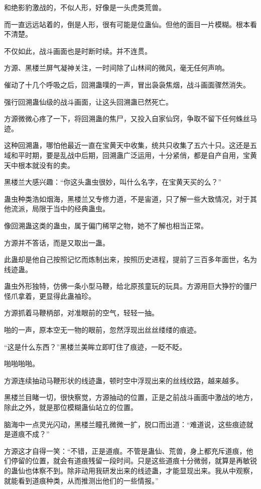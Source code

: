 \begin{this_body}
和绝影豹激战的，不似人形，好像是一头虎类荒兽。

而一直远远站着的，倒是人形，很有可能是位蛊仙。但他的面目一片模糊。根本看不清楚。

不仅如此，战斗画面也是时断时续。并不连贯。

方源、黑楼兰屏气凝神关注，一时间除了山林间的微风，毫无任何声响。

催动了十几个呼吸之后，回溯蛊噗的一声，冒出袅袅焦烟，战斗画面骤然消失。

强行回溯蛊仙级的战斗画面，让这头回溯蛊已然死亡。

方源微微心疼了一下，将回溯蛊的焦尸，又投入自家仙窍，争取不留下任何蛛丝马迹。

这种回溯蛊，哪怕他最近一直在宝黄天中收集，统共只收集了五六十只。这还是五域和平时期，要是乱战中后期，回溯蛊广泛运用，十分紧俏，都是自产自用，宝黄天中根本就没有的卖。

黑楼兰大感兴趣：“你这头蛊虫很妙，叫什么名字，在宝黄天买的么？”

蛊虫种类浩如烟海，黑楼兰又专修力道，不是宙道，只了解一些大致情况，对于其他流派，局限于当中的经典蛊虫。

像回溯蛊这类的蛊虫，属于偏门稀罕之物，她不了解也相当正常。

方源并不答话，而是又取出一蛊。

此蛊却是他自己按照记忆而炼制出来，按照历史进程，提前了三百多年面世，名为线迹蛊。

蛊虫外形独特，仿佛一条小型马鞭，给北原孩童玩的玩具。方源用巨大狰狞的僵尸怪爪拿着，更显得此蛊袖珍。

方源抓着马鞭柄部，对准眼前的空气，轻轻一抽。

啪的一声，原本空无一物的眼前，忽然浮现出丝丝缕缕的痕迹。

“这是什么东西？”黑楼兰美眸立即盯住了痕迹，一眨不眨。

啪啪啪啪。

方源连续抽动马鞭形状的线迹蛊，顿时空中浮现出来的丝线纹路，越来越多。

黑楼兰目睹一切，很快察觉，方源抽动的位置，正是之前战斗画面中激战的地方，除此之外，就是那位模糊蛊仙站立的位置。

脑海中一点灵光闪动，黑楼兰瞳孔微微一扩，脱口而出道：“难道说，这些痕迹就是道痕不成？”

方源这才自得一笑：“不错，正是道痕。不管是蛊仙、荒兽，身上都充斥道痕，他们停留的位置，就会有道痕残留一段时间。只是这些道痕十分微弱，就算是再敏锐的蛊仙也体察不到。除非动用我研发出来的线迹蛊，才能显现出来。我从中观察，就能看到道痕种类，从而推测出他们的一些情报。”


\end{this_body}
